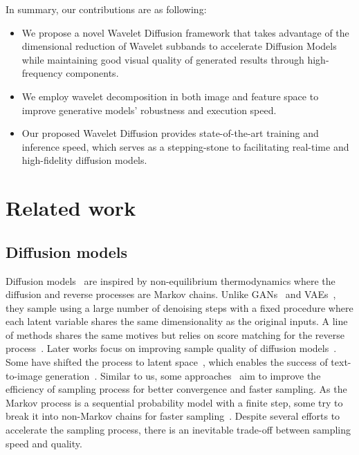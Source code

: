 \documentclass[10pt,twocolumn,letterpaper]{article}
\begin{document}
In summary, our contributions are as following:
\begin{itemize}
    \item We propose a novel Wavelet Diffusion framework that takes advantage of the dimensional reduction of Wavelet subbands to accelerate Diffusion Models while maintaining good visual quality of generated results through high-frequency components.
\item We employ wavelet decomposition in both image and feature space to improve generative models' robustness and execution speed. \item Our proposed Wavelet Diffusion provides state-of-the-art training and inference speed, which serves as a stepping-stone to facilitating real-time and high-fidelity diffusion models. \end{itemize}



\section{Related work}
\label{sec:rel_work}


\subsection{Diffusion models} 


Diffusion models~\cite{sohl2015deep,ho2020denoising} are inspired by non-equilibrium thermodynamics where the diffusion and reverse processes are Markov chains. Unlike GANs~\cite{goodfellow2014generative,karras2019style} and VAEs~\cite{kingma2014vae,vahdat2020nvae}, they sample using a large number of denoising steps with a fixed procedure where each latent variable shares the same dimensionality as the original inputs. A line of methods shares the same motives but relies on score matching for the reverse process~\cite{song2019generative,song2020score,vincent2011connection}. Later works focus on improving sample quality of diffusion models~\cite{song2020improved,dhariwal2021diffusion,song2021maximum}. Some have shifted the process to latent space~\cite{rombach2022high,vahdat2021score}, which enables the success of text-to-image generation~\cite{ramesh2021zero,esser2021imagebart,saharia2022photorealistic,ramesh2022hierarchical}. Similar to us, some approaches~\cite{ma2022accelerating,luhman2021knowledge} aim to improve the efficiency of sampling process for better convergence and faster sampling. As the Markov process is a sequential probability model with a finite step, some try to break it into non-Markov chains for faster sampling~\cite{song2020denoising}. Despite several efforts to accelerate the sampling process, there is an inevitable trade-off between sampling speed and quality. 
\end{document}
